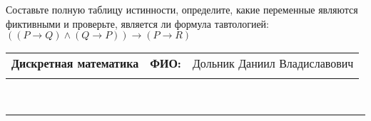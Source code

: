 \documentclass[10pt]{exam}
\newcommand{\class}{Дискретная математика}
\newcommand{\examdate}{}
\begin{document}
\begin{questions}
\begin{enumerate}[a)]
\end{enumerate}\question Составьте полную таблицу истинности, определите, какие переменные являются фиктивными и проверьте, является ли формула тавтологией:
$(( P \rightarrow Q) \land (Q \rightarrow P)) \rightarrow (P \rightarrow R)$

\end{questions}
\newpage
\begin{flushright}
\begin{tabular}{p{2.8in} r l}
\textbf{\class} & \textbf{ФИО:} &Дольник Даниил Владиславович
\\

\textbf{\examdate} &&\\
\end{tabular}\\
\end{flushright}
\rule[1ex]{\textwidth}{.1pt}
\end{document}

